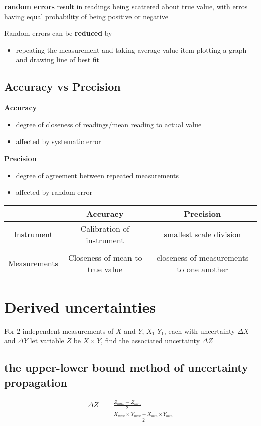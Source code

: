\documentclass[a4paper, 10pt]{article}
\begin{document}
\textbf{random errors} result in readings being scattered about true value, with erros having equal probability of being positive or negative

Random errors can be \textbf{reduced} by 
\begin{itemize}
   \item repeating the measurement and taking average value
   item plotting a graph and drawing line of best fit
\end{itemize}	

\subsection{Accuracy vs Precision}
\textbf{Accuracy}
\begin{itemize}
   \item degree of closeness of readings/mean reading to actual value
   \item affected by systematic error
\end{itemize}	


\textbf{Precision}
\begin{itemize}
   \item degree of agreement between repeated measurements
   \item affected by random error
\end{itemize}	

\begin{center}
   \begin{tabular}{c|c c}
      \hline
      & Accuracy & Precision \\
      \hline
      Instrument & Calibration of instrument & smallest scale division \\ \\
      Measurements & Closeness of mean to true value & closeness of measurements to one another \\
      \hline
   \end{tabular}
\end{center}

\section{Derived uncertainties}
For 2 independent measurements of $X$ and $Y$, $X_1$ $Y_1$, each with uncertainty $\Delta X$ and $\Delta Y$  let variable $Z$ be $X \times Y$, find the associated uncertainty $\Delta Z$ 
\subsection{the upper-lower bound method of uncertainty propagation}
\begin{align*}
   \Delta Z &= \frac{Z_{max} - Z_{min}}{2} \\
            &= \frac{X_{max} \times Y_{max} - X_{min} \times Y_{min}}{2}
\end{align*}	
\end{document}
